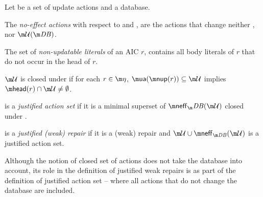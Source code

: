 \begin{definition}
  Let \UU be a set of update actions and \fulldb a database. 
  \begin{compactitem}
   \item The \emph{no-effect actions} with respect to \db and \UU, \shortpaper{$\neff_\db(\UU)$, }are the actions that change neither \db, nor $\UU(\db)$.
   \item The set of \emph{non-updatable literals} of an AIC $r$, contains all body literals of $r$ that do not occur in the head of $r$.
     \longpaper{\[\nup(r) = \body(r) \setminus \litof\left(\head(r)^D\right)\,.\]}
   \item $\UU$ is closed under \aics if for each $r\in \aics$, $\actof(\nup(r))\subseteq \UU$ implies $\head(r)\cap \UU\neq \emptyset$.
   \item \UU is a \emph{justified action set} if it is a minimal superset of $\neff_\db(\UU)$ closed under \aics.
   \item \UU is a \emph{justified (weak) repair} if it is a (weak) repair and $\UU\cup \neff_{\db}(\UU)$ is a justified action set. 
  \end{compactitem}

\end{definition}
Although the notion of closed set of actions does not take the database into account, its role in the definition of justified weak repairs is as part of the definition of justified action set -- where all actions that do not change the database are included.



